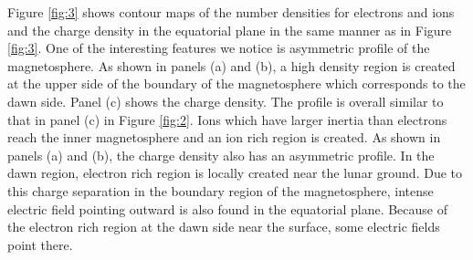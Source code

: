 \documentclass{EPS}
\begin{document}
Figure \ref{fig:3} shows contour maps of the number densities for electrons and ions and the charge density 
in the equatorial plane in the same manner as in Figure \ref{fig:3}. 
One of the interesting features we notice is asymmetric profile of the magnetosphere. 
As shown in panels (a) and (b), a high density region is created 
at the upper side of the boundary of the magnetosphere which corresponds to the dawn side. 
Panel (c) shows the charge density. 
The profile is overall similar to that in panel (c) in Figure \ref{fig:2}. Ions which have larger inertia 
than electrons reach the inner magnetosphere and an ion rich region is created. 
As shown in panels (a) and (b), the charge density also has an asymmetric profile. 
In the dawn region, electron rich region is locally created near the lunar ground. 
Due to this charge separation in the boundary region of the magnetosphere, 
intense electric field pointing outward is also found in the equatorial plane. 
Because of the electron rich region at the dawn side near the surface, some electric fields point there. 
\end{document}
